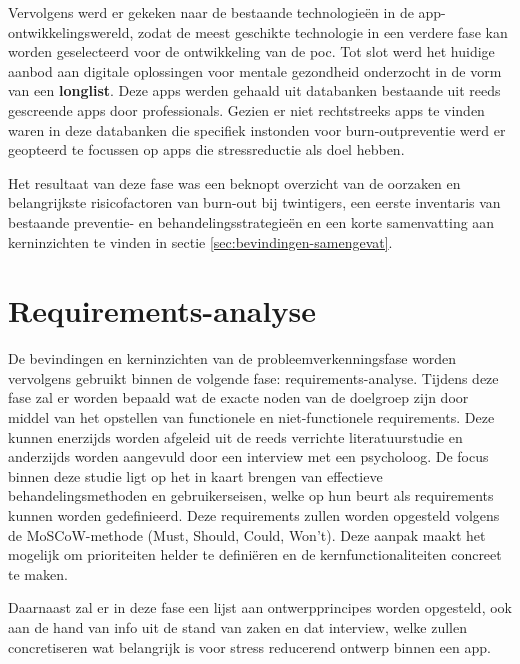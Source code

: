 Vervolgens werd er gekeken naar de bestaande technologieën in de app- \newline ontwikkelingswereld, zodat de meest geschikte technologie in een verdere fase kan worden geselecteerd voor de ontwikkeling van de \acrlong{poc}. Tot slot werd het huidige aanbod aan digitale oplossingen voor mentale gezondheid onderzocht in de vorm van een \textbf{longlist}. Deze apps werden gehaald uit databanken bestaande uit reeds gescreende apps door professionals. Gezien er niet rechtstreeks apps te vinden waren in deze databanken die specifiek instonden voor burn-outpreventie werd er geopteerd te focussen op apps die stressreductie als doel hebben.

\vspace{1em}

Het resultaat van deze fase was een beknopt overzicht van de oorzaken en belangrijkste risicofactoren van burn-out bij twintigers, een eerste inventaris van bestaande preventie- en behandelingsstrategieën en een korte samenvatting aan kerninzichten te vinden in sectie \ref{sec:bevindingen-samengevat}.



\section{Requirements-analyse}
\label{sec:req-analyse}

\vspace{1em}

De bevindingen en kerninzichten van de probleemverkenningsfase worden vervolgens gebruikt binnen de volgende fase: requirements-analyse. Tijdens deze fase zal er worden bepaald wat de exacte noden van de doelgroep zijn door middel van het opstellen van functionele en niet-functionele requirements. Deze kunnen enerzijds worden afgeleid uit de reeds verrichte literatuurstudie en anderzijds worden aangevuld door een interview met een psycholoog. De focus binnen deze studie ligt op het in kaart brengen van effectieve behandelingsmethoden en gebruikerseisen, welke op hun beurt als requirements kunnen worden gedefinieerd. Deze requirements zullen worden opgesteld volgens de MoSCoW-methode (Must, Should, Could, Won’t). Deze aanpak maakt het mogelijk om prioriteiten helder te definiëren en de kernfunctionaliteiten concreet te maken.

\vspace{1em}

Daarnaast zal er in deze fase een lijst aan ontwerpprincipes worden opgesteld, ook aan de hand van info uit de stand van zaken en dat interview, welke zullen concretiseren wat belangrijk is voor stress reducerend ontwerp binnen een app.

